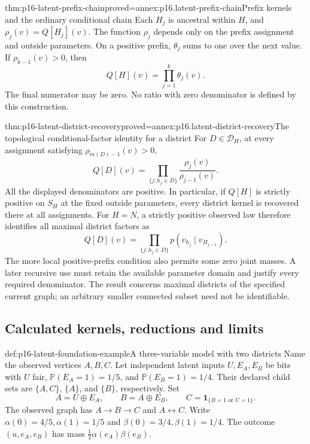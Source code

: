 \begin{hblemma}{thm:p16-latent-prefix-chain}{proved=annex:p16.latent-prefix-chain}{Prefix kernels and the ordinary conditional chain}
Each \(H_j\) is ancestral within \(H\), and
\(\rho_j(v)=Q[H_j](v)\). The function \(\rho_j\) depends
only on the prefix assignment and outside parameters. On a positive
prefix, \(\theta_j\) sums to one over the next value. If
\(\rho_{k-1}(v)>0\), then
\[
 Q[H](v)=\prod_{j=1}^k\theta_j(v).
\]
The final numerator may be zero. No ratio with zero denominator is
defined by this construction.
\end{hblemma}

\begin{hbtheorem}{thm:p16-latent-district-recovery}{proved=annex:p16.latent-district-recovery}{The topological conditional-factor identity for a district}
For \(D\in\mathcal D_H\), at every assignment satisfying
\(\rho_{m(D)-1}(v)>0\),
\[
 Q[D](v)=\prod_{\{j:h_j\in D\}}
                \frac{\rho_j(v)}{\rho_{j-1}(v)}.
\]
All the displayed denominators are positive. In particular, if
\(Q[H]\) is strictly positive on \(S_H\) at the fixed outside
parameters, every district kernel is recovered there at all assignments.
For \(H=N\), a strictly positive observed law therefore identifies
all maximal district factors as
\[
 Q[D](v)=\prod_{\{j:h_j\in D\}}
             p(v_{h_j}\mid v_{H_{j-1}}).
\]
The more local positive-prefix condition also permits some zero
joint masses. A later recursive use must retain the available
parameter domain and justify every required denominator. The result
concerns maximal districts of the specified current graph; an
arbitrary smaller connected subset need not be identifiable.
\end{hbtheorem}

\subsection{Calculated kernels, reductions and limits}

\begin{hbdefinition}{def:p16-latent-foundation-example}{A three-variable model with two districts}
Name the observed vertices \(A,B,C\). Let independent latent inputs
\(U,E_A,E_B\) be bits with \(U\) fair,
\(\mathbb P(E_A=1)=1/5\), and \(\mathbb P(E_B=1)=1/4\).
Their declared child sets are \(\{A,C\}\), \(\{A\}\), and
\(\{B\}\), respectively. Set
\[
 A=U\oplus E_A,\qquad B=A\oplus E_B,\qquad
 C=\mathbf1_{\{B=1\text{ or }U=1\}}.
\]
The observed graph has \(A\to B\to C\) and \(A\leftrightarrow C\).
Write \(\alpha(0)=4/5,\alpha(1)=1/5\) and
\(\beta(0)=3/4,\beta(1)=1/4\).
The outcome \((u,e_A,e_B)\) has mass
\(\frac12\alpha(e_A)\beta(e_B)\).
\end{hbdefinition}

